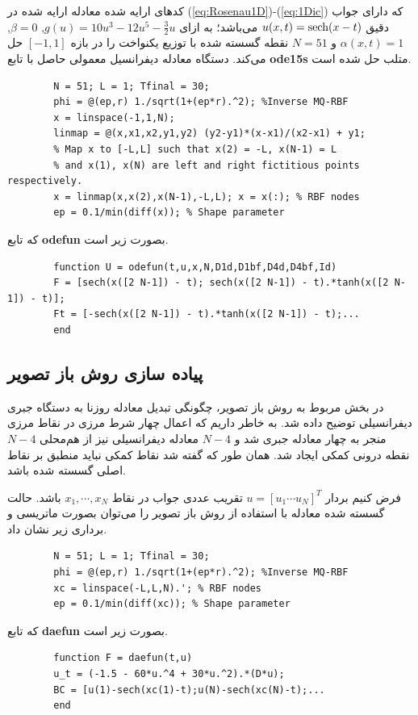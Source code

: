کدهای ارایه شده معادله ارایه شده در 
(\ref{eq:Rosenau1D})-(\ref{eq:1Dic}) 
که دارای جواب دقیق 
$u(x,t)=\textnormal{sech}(x-t)$
می‌باشد؛ به ازای 
$g(u)=10u^3-12u^5-\frac{3}{2}u$, $\beta=0$, $\alpha(x,t)=1$ 
و 
$N=51$
نقطه گسسته شده با توزیع یکنواخت را در بازه
$[-1,1]$
حل می‌کند. دستگاه معادله دیفرانسیل معمولی حاصل با تابع
\textbf{ode15s}
متلب حل شده است.

\begin{latin} 	
	\begin{verbatim}
		N = 51; L = 1; Tfinal = 30;
		phi = @(ep,r) 1./sqrt(1+(ep*r).^2); %Inverse MQ-RBF
		x = linspace(-1,1,N);
		linmap = @(x,x1,x2,y1,y2) (y2-y1)*(x-x1)/(x2-x1) + y1;
		% Map x to [-L,L] such that x(2) = -L, x(N-1) = L
		% and x(1), x(N) are left and right fictitious points respectively.
		x = linmap(x,x(2),x(N-1),-L,L); x = x(:); % RBF nodes
		ep = 0.1/min(diff(x)); % Shape parameter
	\end{verbatim}
\end{latin} 	
که تابع
\textbf{odefun}
بصورت زیر است.
\begin{latin} 	
	\begin{verbatim}
		function U = odefun(t,u,x,N,D1d,D1bf,D4d,D4bf,Id)
		F = [sech(x([2 N-1]) - t); sech(x([2 N-1]) - t).*tanh(x([2 N-1]) - t)];
		Ft = [-sech(x([2 N-1]) - t).*tanh(x([2 N-1]) - t);...
		end
	\end{verbatim}
\end{latin}

\subsection{ پیاده سازی روش باز تصویر}

در بخش‌ مربوط به روش باز تصویر، چگونگی تبدیل معادله روزنا به دستگاه جبری دیفرانسیلی توضیح داده شد. به خاطر داریم که اعمال چهار شرط مرزی در نقاط مرزی منجر به چهار معادله جبری شد و  
$N-4$
معادله دیفرانسیلی نیز از هم‌محلی 
$N-4$
نقطه درونی کمکی ایجاد شد. همان طور که گفته شد نقاط کمکی نباید منطبق بر نقاط اصلی گسسته شده باشد.

فرض کنیم بردار
$u=[u_1 \cdots u_N]^T$
تقریب عددی جواب در نقاط
$x_1,\cdots,x_N $ 
باشد. حالت گسسته شده معادله با استفاده از روش باز تصویر را می‌توان بصورت ماتریسی و برداری زیر نشان داد.


\begin{latin}
	\begin{verbatim}
		N = 51; L = 1; Tfinal = 30;
		phi = @(ep,r) 1./sqrt(1+(ep*r).^2); %Inverse MQ-RBF
		xc = linspace(-L,L,N).'; % RBF nodes
		ep = 0.1/min(diff(xc)); % Shape parameter
	\end{verbatim}
\end{latin}
که تابع
\textbf{daefun} 
بصورت زیر است.
\begin{latin}
	\begin{verbatim}
		function F = daefun(t,u)
		u_t = (-1.5 - 60*u.^4 + 30*u.^2).*(D*u);
		BC = [u(1)-sech(xc(1)-t);u(N)-sech(xc(N)-t);...
		end
	\end{verbatim}
\end{latin}
%
%
